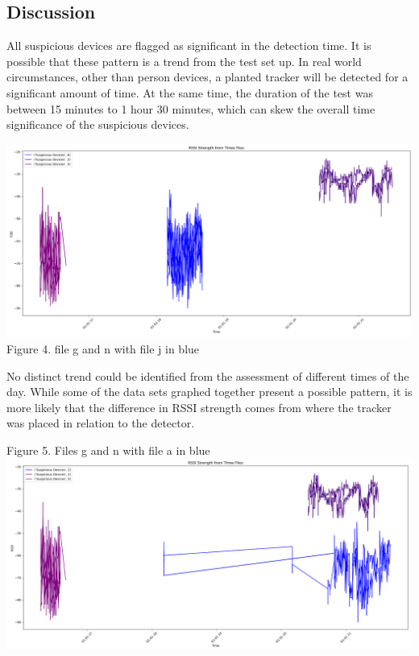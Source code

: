 \documentclass{article}
\begin{document}
\begin{multicols}{2}

\section{Discussion}
All suspicious devices are flagged as significant in the detection time. It is possible that these pattern is a trend from the test set up. In real world circumstances, other than person devices, a planted tracker will be detected for a significant amount of time. At the same time, the duration of the test was between 15 minutes to 1 hour 30 minutes, which can skew the overall time significance of the suspicious devices.
\begin{center}
\includegraphics[width=1\linewidth]{three-g-n-j.png}
Figure 4. file g and n with file j in blue
\end{center}
No distinct trend could be identified from the assessment of different times of the day. While some of the data sets graphed together present a possible pattern, it is more likely that the difference in RSSI strength comes from where the tracker was placed in relation to the detector.
\begin{center}
    
Figure 5. Files g and n with file a in blue
\includegraphics[width=1\linewidth]{timeofday_a_g_n.png}


\end{center}
\end{multicols}
\end{document}
